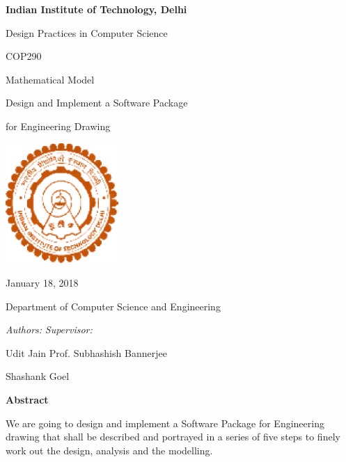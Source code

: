 \documentclass{article} %
\begin{document}


\noindent \textbf{Indian Institute of Technology, Delhi}

\noindent Design Practices in Computer Science

\noindent COP290

\noindent Mathematical Model

\noindent 

\noindent 

\noindent Design and Implement a Software Package 

\noindent for Engineering Drawing

\noindent 

\noindent \includegraphics*[width=1.69in, height=1.80in, keepaspectratio=false]{image5}

\noindent 

\noindent 

\noindent 

\noindent 

\noindent 

\noindent January 18, 2018

\noindent Department of Computer Science and Engineering

\noindent 

\noindent 

\noindent 

\noindent 

\noindent     \textit{Authors:}                                     \textit{Supervisor:                   }

  Udit Jain Prof. Subhashish Bannerjee

\noindent      Shashank Goel

\noindent 

\noindent \textbf{Abstract}

\noindent \textbf{}

\noindent We are going to design and implement a Software Package for Engineering drawing that shall be described and portrayed in a series of five steps to finely work out the design, analysis and the modelling.
\end{document}
